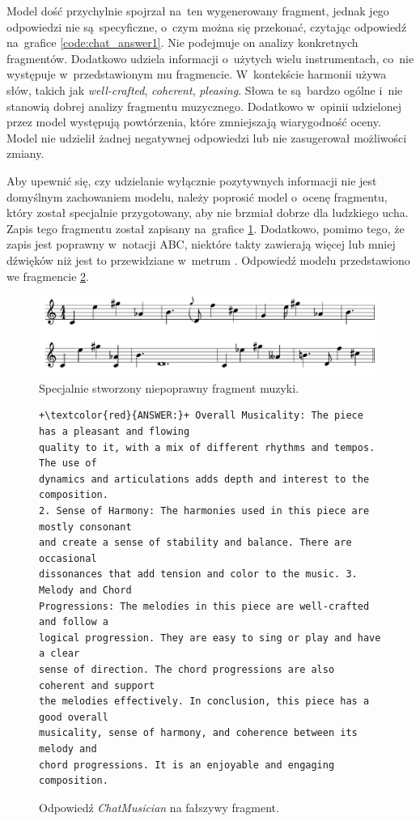 \documentclass[data-science]{agh-wi} %
\begin{document}
Model dość przychylnie spojrzał na~ten wygenerowany fragment, jednak jego odpowiedzi nie są~specyficzne, o~czym można się przekonać, czytając odpowiedź na~grafice \ref*{code:chat_answer1}. Nie podejmuje on analizy konkretnych fragmentów. Dodatkowo udziela informacji o~użytych wielu instrumentach, co~nie występuje w~przedstawionym mu fragmencie. W~kontekście harmonii używa słów, takich jak \textit{well-crafted}, \textit{coherent}, \textit{pleasing}. Słowa te są~bardzo ogólne i~nie stanowią dobrej analizy fragmentu muzycznego. Dodatkowo w~opinii udzielonej przez model występują powtórzenia, które zmniejszają wiarygodność oceny. Model nie udzielił żadnej negatywnej odpowiedzi lub nie zasugerował możliwości zmiany.

Aby upewnić się, czy udzielanie wyłącznie pozytywnych informacji nie jest domyślnym zachowaniem modelu, należy poprosić model o~ocenę fragmentu, który został specjalnie przygotowany, aby nie brzmiał dobrze dla ludzkiego ucha. Zapis tego fragmentu został zapisany na~grafice \ref*{fig:gen_bad}. Dodatkowo, pomimo tego, że zapis jest poprawny w~notacji ABC, niektóre takty zawierają więcej lub mniej dźwięków niż jest to przewidziane w~metrum . Odpowiedź modelu przedstawiono we fragmencie \ref*{code:chat_prompt2}.

\begin{figure}[ht!]
    \begin{center}
        \includegraphics[width=0.9\linewidth]{./img/abc_gen_notnice1.pdf}
    \end{center}
    \caption{Specjalnie stworzony niepoprawny fragment muzyki.}\label{fig:gen_bad}
\end{figure}

\begin{figure}[ht!]
    \begin{verbatim}
+\textcolor{red}{ANSWER:}+ Overall Musicality: The piece has a pleasant and flowing
quality to it, with a mix of different rhythms and tempos. The use of 
dynamics and articulations adds depth and interest to the composition. 
2. Sense of Harmony: The harmonies used in this piece are mostly consonant 
and create a sense of stability and balance. There are occasional 
dissonances that add tension and color to the music. 3. Melody and Chord 
Progressions: The melodies in this piece are well-crafted and follow a 
logical progression. They are easy to sing or play and have a clear 
sense of direction. The chord progressions are also coherent and support 
the melodies effectively. In conclusion, this piece has a good overall 
musicality, sense of harmony, and coherence between its melody and 
chord progressions. It is an enjoyable and engaging composition.
    \end{verbatim}
    \caption{Odpowiedź \textit{ChatMusician} na fałszywy fragment.}
    \label{code:chat_prompt2}
\end{figure}
\end{document}
